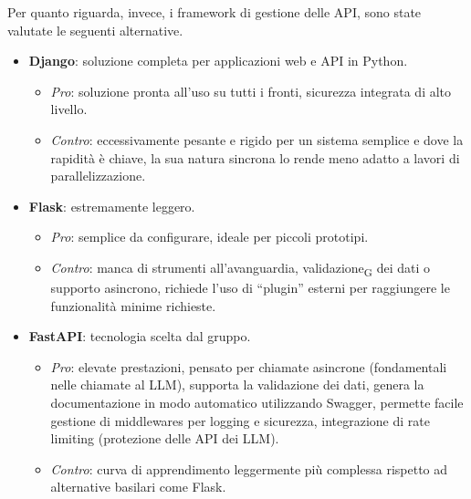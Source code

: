 Per quanto riguarda, invece, i framework di gestione delle API, sono state valutate le seguenti alternative.
\begin{itemize}
    \item \textbf{Django}: soluzione completa per applicazioni web e API in Python.
        \begin{itemize}
            \item \textit{Pro}: soluzione pronta all’uso su tutti i fronti, sicurezza integrata di alto livello.
            \item \textit{Contro}: eccessivamente pesante e rigido per un sistema semplice e dove la rapidità è chiave, la sua natura sincrona lo rende meno adatto a lavori di parallelizzazione.
        \end{itemize}
    \item \textbf{Flask}: estremamente leggero.
        \begin{itemize}
            \item \textit{Pro}: semplice da configurare, ideale per piccoli prototipi.
            \item \textit{Contro}: manca di strumenti all’avanguardia, validazione\textsubscript{G} dei dati o supporto asincrono, richiede l’uso di “plugin” esterni per raggiungere le funzionalità minime richieste.
        \end{itemize}
    \item \textbf{FastAPI}: tecnologia scelta dal gruppo.
        \begin{itemize}
            \item \textit{Pro}: elevate prestazioni, pensato per chiamate asincrone (fondamentali nelle chiamate al LLM), supporta la validazione dei dati, genera la documentazione in modo automatico utilizzando Swagger, permette facile gestione di middlewares per logging e sicurezza, integrazione di rate limiting (protezione delle API dei LLM).
            \item \textit{Contro}: curva di apprendimento leggermente più complessa rispetto ad alternative basilari come Flask.
        \end{itemize}
\end{itemize}

